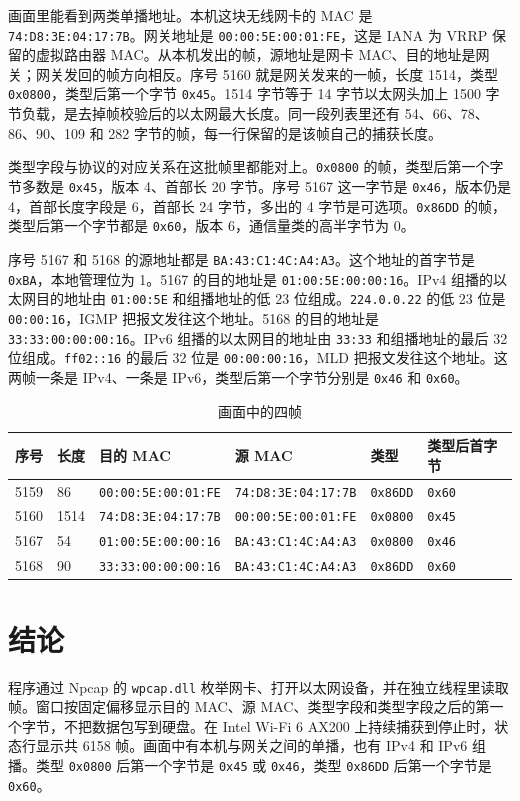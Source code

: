 \documentclass[10.5pt,a4paper,UTF8]{article}
\begin{document}
画面里能看到两类单播地址。本机这块无线网卡的 MAC 是 \texttt{74:D8:3E:04:17:7B}。网关地址是 \texttt{00:00:5E:00:01:FE}，这是 IANA 为 VRRP 保留的虚拟路由器 MAC。从本机发出的帧，源地址是网卡 MAC、目的地址是网关；网关发回的帧方向相反。序号 5160 就是网关发来的一帧，长度 1514，类型 \texttt{0x0800}，类型后第一个字节 \texttt{0x45}。1514 字节等于 14 字节以太网头加上 1500 字节负载，是去掉帧校验后的以太网最大长度。同一段列表里还有 54、66、78、86、90、109 和 282 字节的帧，每一行保留的是该帧自己的捕获长度。

类型字段与协议的对应关系在这批帧里都能对上。\texttt{0x0800} 的帧，类型后第一个字节多数是 \texttt{0x45}，版本 4、首部长 20 字节。序号 5167 这一字节是 \texttt{0x46}，版本仍是 4，首部长度字段是 6，首部长 24 字节，多出的 4 字节是可选项。\texttt{0x86DD} 的帧，类型后第一个字节都是 \texttt{0x60}，版本 6，通信量类的高半字节为 0。

序号 5167 和 5168 的源地址都是 \texttt{BA:43:C1:4C:A4:A3}。这个地址的首字节是 \texttt{0xBA}，本地管理位为 1。5167 的目的地址是 \texttt{01:00:5E:00:00:16}。IPv4 组播的以太网目的地址由 \texttt{01:00:5E} 和组播地址的低 23 位组成。\texttt{224.0.0.22} 的低 23 位是 \texttt{00:00:16}，IGMP 把报文发往这个地址。5168 的目的地址是 \texttt{33:33:00:00:00:16}。IPv6 组播的以太网目的地址由 \texttt{33:33} 和组播地址的最后 32 位组成。\texttt{ff02::16} 的最后 32 位是 \texttt{00:00:00:16}，MLD 把报文发往这个地址。这两帧一条是 IPv4、一条是 IPv6，类型后第一个字节分别是 \texttt{0x46} 和 \texttt{0x60}。

\begin{table}[htbp]
\centering
\caption{画面中的四帧}
\label{tab:sample}
\small
\setlength{\tabcolsep}{4pt}
\begin{tabular}{llllll}
\toprule
序号 & 长度 & 目的 MAC & 源 MAC & 类型 & 类型后首字节 \\
\midrule
5159 & 86 & \texttt{00:00:5E:00:01:FE} & \texttt{74:D8:3E:04:17:7B} & \texttt{0x86DD} & \texttt{0x60} \\
5160 & 1514 & \texttt{74:D8:3E:04:17:7B} & \texttt{00:00:5E:00:01:FE} & \texttt{0x0800} & \texttt{0x45} \\
5167 & 54 & \texttt{01:00:5E:00:00:16} & \texttt{BA:43:C1:4C:A4:A3} & \texttt{0x0800} & \texttt{0x46} \\
5168 & 90 & \texttt{33:33:00:00:00:16} & \texttt{BA:43:C1:4C:A4:A3} & \texttt{0x86DD} & \texttt{0x60} \\
\bottomrule
\end{tabular}
\end{table}

\section{结论}
程序通过 Npcap 的 \texttt{wpcap.dll} 枚举网卡、打开以太网设备，并在独立线程里读取帧。窗口按固定偏移显示目的 MAC、源 MAC、类型字段和类型字段之后的第一个字节，不把数据包写到硬盘。在 Intel Wi-Fi 6 AX200 上持续捕获到停止时，状态行显示共 6158 帧。画面中有本机与网关之间的单播，也有 IPv4 和 IPv6 组播。类型 \texttt{0x0800} 后第一个字节是 \texttt{0x45} 或 \texttt{0x46}，类型 \texttt{0x86DD} 后第一个字节是 \texttt{0x60}。
\end{document}
